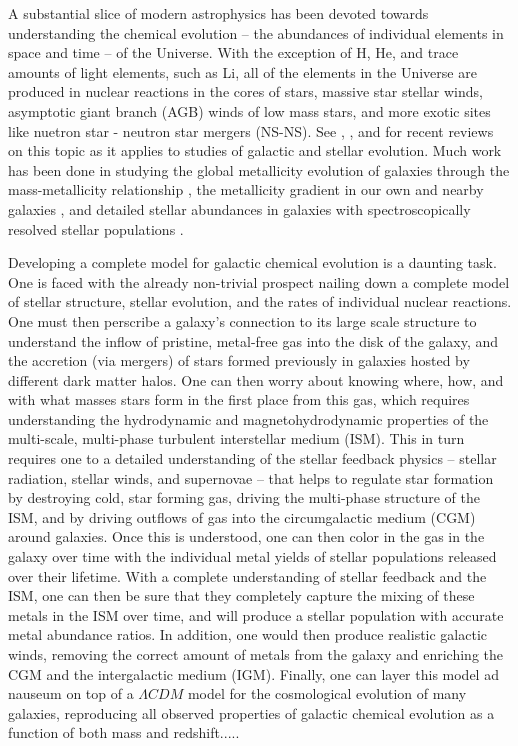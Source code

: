 A substantial slice of modern astrophysics has been devoted towards understanding the chemical evolution -- the abundances of individual elements in space and time -- of the Universe. With the exception of H, He, and trace amounts of light elements, such as Li, all of the elements in the Universe are produced in nuclear reactions in the cores of stars, massive star stellar winds, asymptotic giant branch (AGB) winds of low mass stars, and more exotic sites like nuetron star - neutron star mergers (NS-NS). See \cite{Nomoto2013}, \cite{Thielmann2017}, and \cite{Frebel2018} for recent reviews on this topic as it applies to studies of galactic and stellar evolution. Much work has been done in studying the global metallicity evolution of galaxies through the mass-metallicity relationship \citep[e.g.][]{Lequeux1979,Tremonti2004,Lee2006,Zahid2012}, the metallicity gradient in our own and nearby galaxies \citep[e.g.][]{}, and detailed stellar abundances in galaxies with spectroscopically resolved stellar populations \citep[e.g.][]{}. 

Developing a complete model for galactic chemical evolution is a daunting task. One is faced with the already non-trivial prospect nailing down a complete model of stellar structure, stellar evolution, and the rates of individual nuclear reactions. One must then perscribe a galaxy's connection to its large scale structure to understand the inflow of pristine, metal-free gas into the disk of the galaxy, and the accretion (via mergers) of stars formed previously in galaxies hosted by different dark matter halos. One can then worry about knowing where, how, and with what masses stars form in the first place from this gas, which requires understanding the hydrodynamic and magnetohydrodynamic properties of the multi-scale, multi-phase turbulent interstellar medium (ISM). This in turn requires one to a detailed understanding of the stellar feedback physics -- stellar radiation, stellar winds, and supernovae -- that helps to regulate star formation by destroying cold, star forming gas, driving the multi-phase structure of the ISM, and by driving outflows of gas into the circumgalactic medium (CGM) around galaxies. Once this is understood, one can then color in the gas in the galaxy over time with the individual metal yields of stellar populations released over their lifetime. With a complete understanding of stellar feedback and the ISM, one can then be sure that they completely capture the mixing of these metals in the ISM over time, and will produce a stellar population with accurate metal abundance ratios. In addition, one would then produce realistic galactic winds, removing the correct amount of metals from the galaxy and enriching the CGM and the intergalactic medium (IGM). Finally, one can layer this model ad nauseum on top of a $\Lambda CDM$ model for the cosmological evolution of many galaxies, reproducing all observed properties of galactic chemical evolution as a function of both mass and redshift.....

